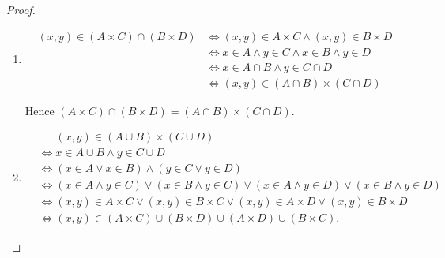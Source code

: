 \begin{proof}
	\begin{enumerate}[label={(\alph*)},leftmargin=*]
		\item \begingroup
		      \allowdisplaybreaks%
		      \begin{align*}
			      (x, y) \in (A \times C) \cap (B \times D) & \iff (x, y) \in A \times C \land (x, y) \in B \times D \\
			                                                & \iff x \in A \land y \in C \land x \in B \land y \in D \\
			                                                & \iff x \in A \cap B \land y \in C \cap D               \\
			                                                & \iff (x, y) \in (A \cap B) \times (C \cap D)
		      \end{align*}
		      \endgroup

		      Hence \( (A \times C) \cap (B \times D) = (A \cap B) \times (C \cap D) \).
		\item \begingroup
		      \allowdisplaybreaks%
		      \begin{align*}
			       & \phantom{\iff} (x, y) \in (A \cup B) \times (C \cup D)                                                              \\
			       & \iff x \in A \cup B \land y \in C \cup D                                                                            \\
			       & \iff (x \in A \lor x \in B) \land (y \in C \lor y \in D)                                                            \\
			       & \iff (x \in A \land y \in C) \lor (x \in B \land y \in C) \lor (x \in A \land y \in D) \lor (x \in B \land y \in D) \\
			       & \iff (x, y) \in A\times C \lor (x, y) \in B\times C \lor (x, y) \in A \times D \lor (x, y) \in B \times D           \\
			       & \iff (x, y) \in (A \times C) \cup (B \times D) \cup (A \times D) \cup (B \times C).
		      \end{align*}
		      \endgroup


\end{enumerate}
\end{proof}
